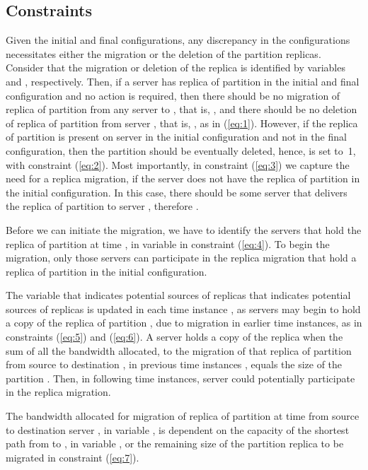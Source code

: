 \subsection{Constraints}
Given the initial and final configurations, any discrepancy in the configurations necessitates either the migration or the deletion of the partition replicas. Consider that the migration or deletion of the replica is identified by variables
  and , respectively. Then, if a server  has replica of partition  in the initial and final configuration and no action is required, then there should be no migration of replica of partition    from any server  to , that is, ,  and there should be no deletion of replica of partition  from server , that is,  , as in (\ref{eq:1}).  However, if the replica of partition  is present on server  in the initial configuration and not in the final configuration, then the partition should be eventually deleted, hence,  is set to~1, with constraint (\ref{eq:2}). Most importantly, in constraint (\ref{eq:3}) we capture the need for a replica migration, if the server  does not have the replica of partition  in the initial configuration. In this case, there should be some server  that delivers the replica of partition  to server , therefore .



Before we can initiate the migration, we have to identify the servers  that hold the replica of partition  at time , in variable  in constraint (\ref{eq:4}). To begin the migration, only those servers  can participate in the replica migration that hold a replica of partition  in the initial configuration.

The variable  that indicates potential sources of replicas that indicates potential sources of replicas is updated in each time instance , as servers  may begin to hold a copy of the replica of partition , due to migration in earlier time instances, as in constraints (\ref{eq:5}) and (\ref{eq:6}). A server holds a copy of the replica when the sum of all the bandwidth allocated,  to the migration of that replica of partition  from source  to destination , in previous time instances , equals the size of the partition . Then, in following time instances, server  could potentially participate in the replica migration.
\vspace{-5mm}

\vspace{-10mm}

The bandwidth allocated for migration of replica of partition  at time  from source  to destination server , in variable , is dependent on the capacity of the shortest path from  to , in variable , or the remaining size of the partition replica to be migrated in constraint (\ref{eq:7}).
\vspace{-3mm}

